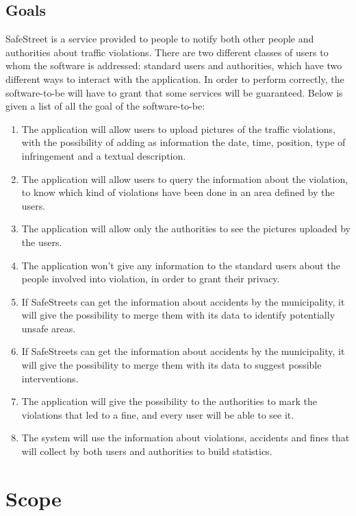 \documentclass[a4paper, hidelinks, 12pt]{report}
\newcommand\goal[1]{\item[{[G#1]}] }
\begin{document}
        \subsection{Goals}\label{subsec:goals}
            SafeStreet is a service provided to people to notify both other people and authorities about traffic violations. There are two different classes of users to whom the software is addressed: standard users and authorities, which have two different ways to interact with the application.
            In order to perform correctly, the software-to-be will have to grant that some services will be guaranteed. Below is given a list of all the goal of the software-to-be:
            \begin{enumerate}
                \goal{1} The application will allow users to upload pictures of the traffic violations, with the possibility of adding as information the date, time, position, type of infringement and a textual description.
                \goal{2} The application will allow users to query the information about the violation, to know which kind of violations have been done in an area defined by the users.
                \goal{3} The application will allow only the authorities to see the pictures uploaded by the users.
                \goal{4} The application won’t give any information to the standard users about the people involved into violation, in order to grant their privacy.
                \goal{5} If SafeStreets can get the information about accidents by the municipality, it will give the possibility to merge them with its data to identify potentially unsafe areas.
                \goal{6} If SafeStreets can get the information about accidents by the municipality, it will give the possibility to merge them with its data to suggest possible interventions.
                \goal{7} The application will give the possibility to the authorities to mark the violations that led to a fine, and every user will be able to see it.
                \goal{8} The system will use the information about violations, accidents and fines that will collect by both users and authorities to build statistics.
            \end{enumerate}
	\section{Scope}\label{sec:scope}
\end{document}
